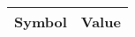 \begin{tabular}{cl}
\hline
  Symbol  & Value                                                                                                                                                                                                                                                                                                                                                                                                                                                                                                                                                                                                                                                                                                                                                                                                                                                                                                                                                                                                                                                                                                                                                                                                                                                                                                                                                                                                                                                                                                                                                                                                                                                                                                                                                                                                                                           \\
\hline

\end{tabular}
